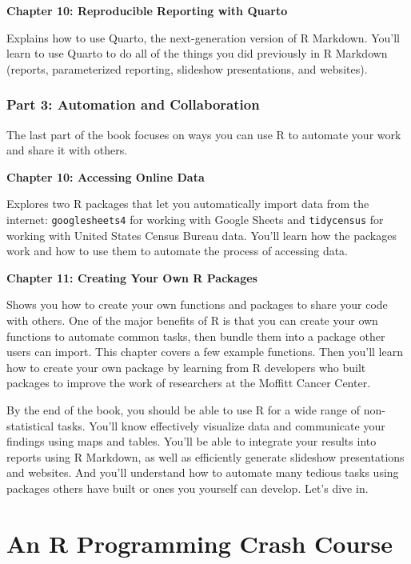 \documentclass[
]{book}
\begin{document}
\textbf{Chapter 10: Reproducible Reporting with Quarto}

Explains how to use Quarto, the next-generation version of R Markdown. You'll learn to use Quarto to do all of the things you did previously in R Markdown (reports, parameterized reporting, slideshow presentations, and websites).

\hypertarget{part-3-automation-and-collaboration}{%
\subsection*{Part 3: Automation and Collaboration}\label{part-3-automation-and-collaboration}}

The last part of the book focuses on ways you can use R to automate your work and share it with others.

\textbf{Chapter 10: Accessing Online Data}

Explores two R packages that let you automatically import data from the internet: \texttt{googlesheets4} for working with Google Sheets and \texttt{tidycensus} for working with United States Census Bureau data. You'll learn how the packages work and how to use them to automate the process of accessing data.

\textbf{Chapter 11: Creating Your Own R Packages}

Shows you how to create your own functions and packages to share your code with others. One of the major benefits of R is that you can create your own functions to automate common tasks, then bundle them into a package other users can import. This chapter covers a few example functions. Then you'll learn how to create your own package by learning from R developers who built packages to improve the work of researchers at the Moffitt Cancer Center.

By the end of the book, you should be able to use R for a wide range of non-statistical tasks. You'll know effectively visualize data and communicate your findings using maps and tables. You'll be able to integrate your results into reports using R Markdown, as well as efficiently generate slideshow presentations and websites. And you'll understand how to automate many tedious tasks using packages others have built or ones you yourself can develop. Let's dive in.

\hypertarget{howto-chapter}{%
\chapter{An R Programming Crash Course}\label{howto-chapter}}
\end{document}
